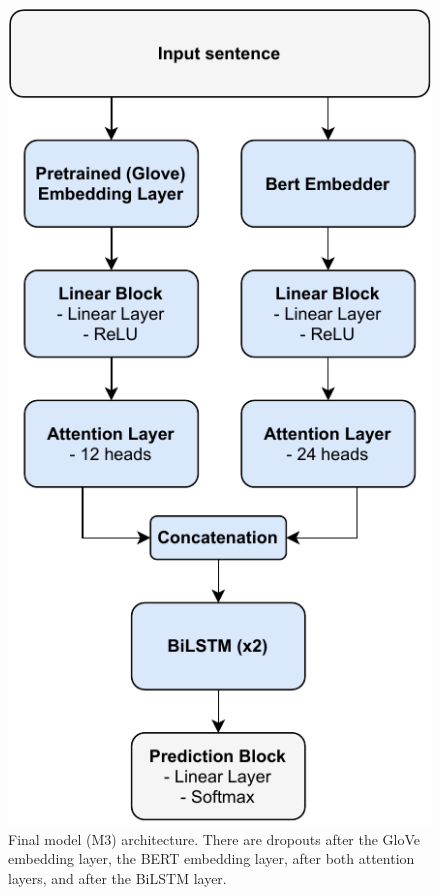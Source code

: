 \documentclass[11pt,a4paper]{article}
\begin{document}
	
	\begin{figure}[H]
		\centering
		\includegraphics[width=0.9\columnwidth]{M3_diagram.pdf}
		\caption{Final model (M3) architecture. There are dropouts after the GloVe embedding layer, the BERT embedding layer, after both attention layers, and after the BiLSTM layer.}
		\label{fig:M3_architecture}
	\end{figure}
	
	
	
\end{document}
